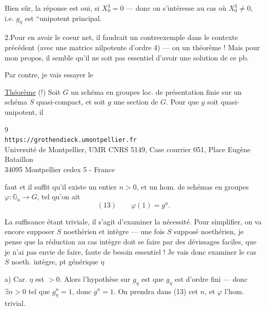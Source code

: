 Bien sûr, la  réponse est  oui, si $X_0^3=0$  --- donc on s'intéresse au cas où $X_0^3\ne0$, i.e.  $g_\eta$ est ``unipotent principal.

2.\quad Pour en avoir le coeur net, il faudrait un contreexemple dans le contexte précédent (avec une matrice nilpotente d'ordre 4) --- ou un théorème ! Mais pour mon propos, il semble qu'il ne soit pas essentiel d'avoir une solution de ce pb.

Par contre, je vais essayer le

\uline{Théorème} (!) Soit $G$ un schéma en groupes  loc. de présentation finie sur un schéma $S$ quasi-compact, et soit $g$ une section de $G$. Pour que $g$ soit quasi-unipotent, il

\begin{center}
\small
9\\
\texttt{https://grothendieck.umontpellier.fr}\\
Université de Montpellier, UMR CNRS 5149, Case courrier 051, Place Eugène Bataillon\\
34095 Montpellier cedex 5 - France
\end{center}

faut et il suffit qu'il existe un entier $n>0$, et un hom. de schémas en groupes $\varphi:\mathbb G_a\longrightarrow G$, tel qu'on ait
\[
(13)\qquad \varphi(1)=g^n.
\]

La suffisance étant triviale, il s'agit d'examiner la nécessité. Pour simplifier, on va encore supposer $S$ noethérien et intègre --- une fois $S$ supposé noethérien, je pense que la réduction au cas intègre doit se faire par des dévissages faciles, que je n'ai pas envie de faire, faute de besoin essentiel ! Je vais donc examiner le cas $S$ noeth. intègre, pt générique $\eta$

a) Car.  $\eta$ est $>0$. Alors  l'hypothèse sur $g_\eta$ est que $g_\eta$ est d'ordre fini --- donc $\exists n>0$ tel que $g_\eta^n=1$, donc $g^n=1$. On prendra dans (13) cet $n$, et $\varphi$ l'hom. trivial.

